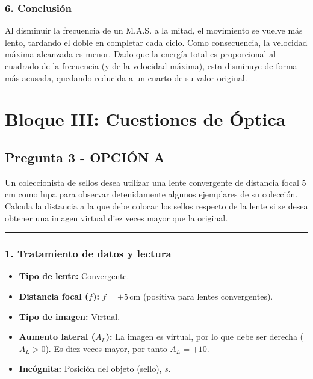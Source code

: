 \subsubsection*{6. Conclusión}
\begin{cajaconclusion}
Al disminuir la frecuencia de un M.A.S. a la mitad, el movimiento se vuelve más lento, tardando el doble en completar cada ciclo. Como consecuencia, la velocidad máxima alcanzada es menor. Dado que la energía total es proporcional al cuadrado de la frecuencia (y de la velocidad máxima), esta disminuye de forma más acusada, quedando reducida a un cuarto de su valor original.
\end{cajaconclusion}

\newpage

\section{Bloque III: Cuestiones de Óptica}
\label{sec:optica_2003_jun_ord}

\subsection{Pregunta 3 - OPCIÓN A}
\label{subsec:3A_2003_jun_ord}

\begin{cajaenunciado}
Un coleccionista de sellos desea utilizar una lente convergente de distancia focal 5 cm como lupa para observar detenidamente algunos ejemplares de su colección. Calcula la distancia a la que debe colocar los sellos respecto de la lente si se desea obtener una imagen virtual diez veces mayor que la original.
\end{cajaenunciado}
\hrule

\subsubsection*{1. Tratamiento de datos y lectura}
\begin{itemize}
    \item \textbf{Tipo de lente:} Convergente.
    \item \textbf{Distancia focal ($f$):} $f = +5 \, \text{cm}$ (positiva para lentes convergentes).
    \item \textbf{Tipo de imagen:} Virtual.
    \item \textbf{Aumento lateral ($A_L$):} La imagen es virtual, por lo que debe ser derecha ($A_L > 0$). Es diez veces mayor, por tanto $A_L = +10$.
    \item \textbf{Incógnita:} Posición del objeto (sello), $s$.
\end{itemize}

